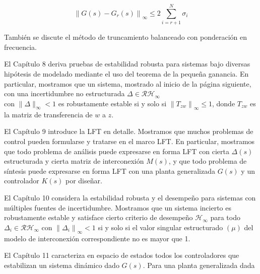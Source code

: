 $$
\left\|G(s)-G_{r}(s)\right\|_{\infty} \leq 2 \sum_{i=r+1}^{N} \sigma_{i}
$$

También se discute el método de truncamiento balanceado con ponderación en frecuencia.

El Capítulo 8 deriva pruebas de estabilidad robusta para sistemas bajo diversas hipótesis de modelado mediante el uso del teorema de la pequeña ganancia. En particular, mostramos que un sistema, mostrado al inicio de la página siguiente, con una incertidumbre no estructurada $\Delta \in \mathcal{R} \mathcal{H}_{\infty}$\\
con $\|\Delta\|_{\infty}<1$ es robustamente estable si y solo si $\left\|T_{z w}\right\|_{\infty} \leq 1$, donde $T_{z w}$ es la matriz de transferencia de $w$ a $z$.


El Capítulo 9 introduce la LFT en detalle. Mostramos que muchos problemas de control pueden formularse y tratarse en el marco LFT. En particular, mostramos que todo problema de análisis puede expresarse en forma LFT con cierta $\Delta(s)$ estructurada y cierta matriz de interconexión $M(s)$, y que todo problema de síntesis puede expresarse en forma LFT con una planta generalizada $G(s)$ y un controlador $K(s)$ por diseñar.\\

El Capítulo 10 considera la estabilidad robusta y el desempeño para sistemas con múltiples fuentes de incertidumbre. Mostramos que un sistema incierto es robustamente estable y satisface cierto criterio de desempeño $\mathcal{H}_{\infty}$ para todo $\Delta_{i} \in \mathcal{R} \mathcal{H}_{\infty}$ con $\left\|\Delta_{i}\right\|_{\infty}<1$ si y solo si el valor singular estructurado $(\mu)$ del modelo de interconexión correspondiente no es mayor que 1.


El Capítulo 11 caracteriza en espacio de estados todos los controladores que estabilizan un sistema dinámico dado $G(s)$. Para una planta generalizada dada

